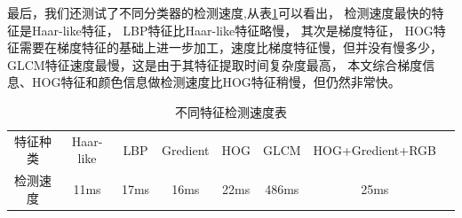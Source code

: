 最后，我们还测试了不同分类器的检测速度,从表\ref{tab:tezhengcesudu}可以看出，
检测速度最快的特征是Haar-like特征，
LBP特征比Haar-like特征略慢，
其次是梯度特征，
HOG特征需要在梯度特征的基础上进一步加工，速度比梯度特征慢，但并没有慢多少，
GLCM特征速度最慢，这是由于其特征提取时间复杂度最高，
本文综合梯度信息、HOG特征和颜色信息做检测速度比HOG特征稍慢，但仍然非常快。
\begin{table}
\centering
\begin{tabular}{cccccccp{38mm}}
\toprule
\mbox{特征种类} & \mbox{Haar-like} & \mbox{LBP} & \mbox{Gredient} & \mbox{HOG} & \mbox{GLCM} & \mbox{HOG+Gredient+RGB}  \\
\mbox{检测速度} & 11ms & 17ms & 16ms & 22ms & 486ms & 25ms \\
\bottomrule
\end{tabular}
\caption{不同特征检测速度表}
\label{tab:tezhengcesudu}
\end{table}
